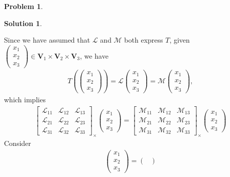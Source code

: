 \documentclass{article}
\theoremstyle{definition}
\newtheorem*{prob*}{Problem}
\newtheorem*{sln*}{Solution}
\newcommand{\V}{\mathbf{V}}
\newcommand{\lag}{\mathcal{L}}
\newcommand{\M}{\mathcal{M}}
\begin{document}
\begin{prob*}
\begin{sln*}
\begin{enumerate}
			Since we have assumed that $\lag$ and $\M$ both express $T$, given $\begin{pmatrix}
			x_1 \\x_2 \\x_3
			\end{pmatrix}\in \V_1 \times \V_2 \times \V_3$, we have
			\begin{align*}
			T\left(\begin{pmatrix}
			x_1 \\x_2 \\x_3
			\end{pmatrix}\right)
			=
			\lag \begin{pmatrix}
			x_1 \\x_2 \\x_3
			\end{pmatrix}
			=
			\M \begin{pmatrix}
			x_1 \\x_2 \\x_3
			\end{pmatrix},
			\end{align*}
			which implies
			\begin{align*}
			\begin{bmatrix}
			\lag_{11} & \lag_{12} & \lag_{13}\\
			\lag_{21} & \lag_{22} & \lag_{23}\\
			\lag_{31} & \lag_{32} & \lag_{33} 
			\end{bmatrix}_\times \begin{pmatrix}
			x_1 \\x_2 \\x_3
			\end{pmatrix}
			=
			\begin{bmatrix}
			\M_{11} & \M_{12} & \M_{13}\\
			\M_{21} & \M_{22} & \M_{23}\\
			\M_{31} & \M_{32} & \M_{33}
			\end{bmatrix}_\times \begin{pmatrix}
			x_1 \\x_2 \\x_3
			\end{pmatrix}
			\end{align*}
			Consider
			\begin{align*}
			\begin{pmatrix}
			x_1\\x_2\\x_3
			\end{pmatrix}
			= \begin{pmatrix}

\end{pmatrix}
\end{align*}
\end{enumerate}
\end{sln*}
\end{prob*}
\end{document}
